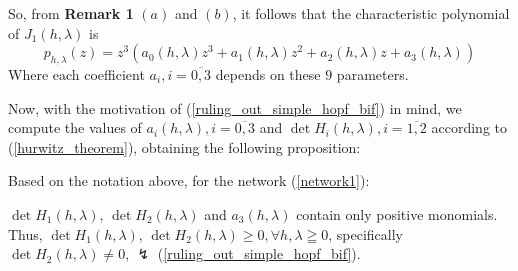 So, from \textbf{Remark 1} $(a)$ and $(b)$, it follows that the characteristic polynomial of $J_1(h, \lambda)$ is
\[
	p_{h,\lambda}(z) = z^3 (a_0(h,\lambda) z^3 + a_1(h, \lambda)z^2 + a_2 (h,\lambda)z + a_3(h,\lambda) )
\]
Where each coefficient $a_i, i = \overline{0,3}$ depends on these $9$ parameters.

Now, with the motivation of (\ref{ruling_out_simple_hopf_bif}) in mind, we compute the values of $a_i(h,\lambda), i = \overline{0,3}$ and $\det H_i(h,\lambda), i = \overline{1,2}$ according to (\ref{hurwitz_theorem}), obtaining the following proposition:
\begin{proposition}
	Based on the notation above, for the network (\ref{network1}):

	$\det H_1(h,\lambda)$, $\det H_2(h,\lambda)$ and $a_3(h,\lambda)$ contain only positive monomials. Thus, $\det H_1(h,\lambda)$, $\det H_2(h,\lambda) \geq 0, \forall h, \lambda \geqq 0$, specifically $\det H_2(h,\lambda) \neq 0$, $\lightning$ (\ref{ruling_out_simple_hopf_bif}).
\end{proposition}
